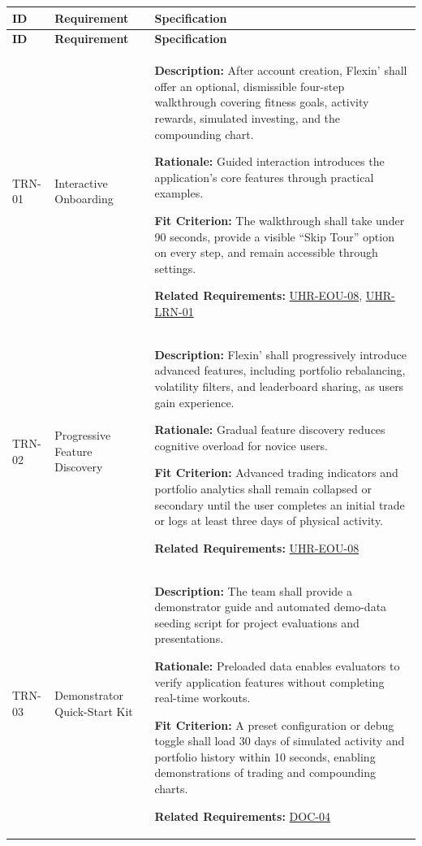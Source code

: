 \documentclass[12pt]{article}
\begin{document}
\small
\setlength{\tabcolsep}{4pt}
\begin{xltabular}{\textwidth}{|p{2.6cm}|p{3.4cm}|X|}
\hline
\textbf{ID} & \textbf{Requirement} & \textbf{Specification} \\
\hline
\endfirsthead
\hline
\textbf{ID} & \textbf{Requirement} & \textbf{Specification} \\
\hline
\endhead

TRN-01\hypertarget{req:TRN-01}{} &
Interactive Onboarding &
\textbf{Description:} After account creation, Flexin' shall offer an optional, dismissible four-step walkthrough covering fitness goals, activity rewards, simulated investing, and the compounding chart.

\textbf{Rationale:} Guided interaction introduces the application's core features through practical examples.

\textbf{Fit Criterion:} The walkthrough shall take under 90 seconds, provide a visible ``Skip Tour'' option on every step, and remain accessible through settings.

\textbf{Related Requirements:} \hyperlink{req:UHR-EOU-08}{UHR-EOU-08}, \hyperlink{req:UHR-LRN-01}{UHR-LRN-01}\\
\hline

TRN-02\hypertarget{req:TRN-02}{} &
Progressive Feature Discovery &
\textbf{Description:} Flexin' shall progressively introduce advanced features, including portfolio rebalancing, volatility filters, and leaderboard sharing, as users gain experience.

\textbf{Rationale:} Gradual feature discovery reduces cognitive overload for novice users.

\textbf{Fit Criterion:} Advanced trading indicators and portfolio analytics shall remain collapsed or secondary until the user completes an initial trade or logs at least three days of physical activity.

\textbf{Related Requirements:} \hyperlink{req:UHR-EOU-08}{UHR-EOU-08}\\
\hline

TRN-03\hypertarget{req:TRN-03}{} &
Demonstrator Quick-Start Kit &
\textbf{Description:} The team shall provide a demonstrator guide and automated demo-data seeding script for project evaluations and presentations.

\textbf{Rationale:} Preloaded data enables evaluators to verify application features without completing real-time workouts.

\textbf{Fit Criterion:} A preset configuration or debug toggle shall load 30 days of simulated activity and portfolio history within 10 seconds, enabling demonstrations of trading and compounding charts.

\textbf{Related Requirements:} \hyperlink{req:DOC-04}{DOC-04}\\
\hline

\end{xltabular}
\end{document}
